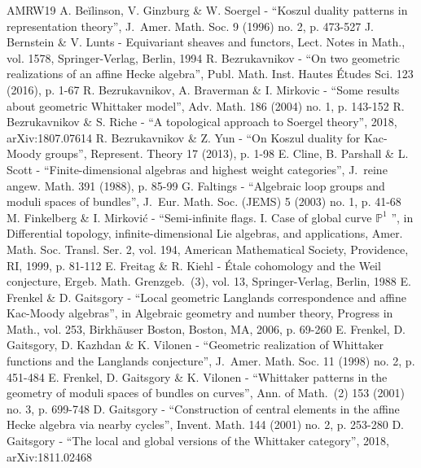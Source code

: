 \documentclass[10pt]{article}
\theoremstyle{remark}
\numberwithin{equation}{section}
\begin{document}
\begin{thebibliography}{AMRW19}
 A. Beĭlinson, V. Ginzburg \& W. Soergel - “Koszul duality patterns in representation theory”, J. Amer. Math. Soc. 9 (1996) no. 2, p. 473-527
 J. Bernstein \& V. Lunts - Equivariant sheaves and functors, Lect. Notes in Math., vol. 1578, Springer-Verlag, Berlin, 1994
 R. Bezrukavnikov - “On two geometric realizations of an affine Hecke algebra”, Publ. Math. Inst. Hautes Études Sci. 123 (2016), p. 1-67
 R. Bezrukavnikov, A. Braverman \& I. Mirkovic - “Some results about geometric Whittaker model”, Adv. Math. 186 (2004) no. 1, p. 143-152
 R. Bezrukavnikov \& S. Riche - “A topological approach to Soergel theory”, 2018, arXiv:1807.07614
 R. Bezrukavnikov \& Z. Yun - “On Koszul duality for Kac-Moody groups”, Represent. Theory 17 (2013), p. 1-98
 E. Cline, B. Parshall \& L. Scott - “Finite-dimensional algebras and highest weight categories”, J. reine angew. Math. 391 (1988), p. 85-99
 G. Faltings - “Algebraic loop groups and moduli spaces of bundles”, J. Eur. Math. Soc. (JEMS) 5 (2003) no. 1, p. 41-68
 M. Finkelberg \& I. Mirković - “Semi-infinite flags. I. Case of global curve $\mathbb{P}^1$ ”, in Differential topology, infinite-dimensional Lie algebras, and applications, Amer. Math. Soc. Transl. Ser. 2, vol. 194, American Mathematical Society, Providence, RI, 1999, p. 81-112
 E. Freitag \& R. Kiehl - Étale cohomology and the Weil conjecture, Ergeb. Math. Grenzgeb. (3), vol. 13, Springer-Verlag, Berlin, 1988
 E. Frenkel \& D. Gaitsgory - “Local geometric Langlands correspondence and affine Kac-Moody algebras”, in Algebraic geometry and number theory, Progress in Math., vol. 253, Birkhäuser Boston, Boston, MA, 2006, p. 69-260
 E. Frenkel, D. Gaitsgory, D. Kazhdan \& K. Vilonen - “Geometric realization of Whittaker functions and the Langlands conjecture”, J. Amer. Math. Soc. 11 (1998) no. 2, p. 451-484
 E. Frenkel, D. Gaitsgory \& K. Vilonen - “Whittaker patterns in the geometry of moduli spaces of bundles on curves”, Ann. of Math. (2) 153 (2001) no. 3, p. 699-748
 D. Gaitsgory - “Construction of central elements in the affine Hecke algebra via nearby cycles”, Invent. Math. 144 (2001) no. 2, p. 253-280
 D. Gaitsgory - “The local and global versions of the Whittaker category”, 2018, arXiv:1811.02468

\end{thebibliography}
\end{document}
